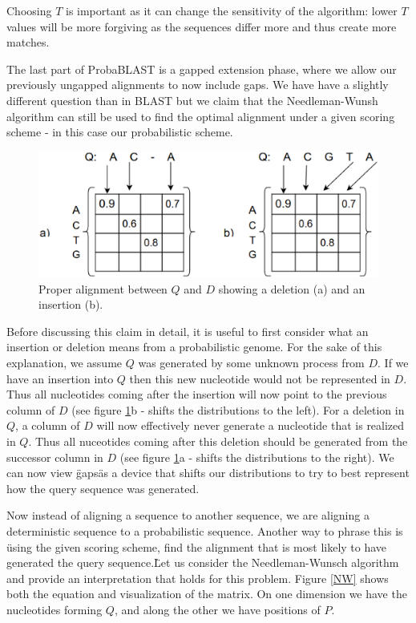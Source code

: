 \documentclass[12pt]{article}%
\begin{document}
Choosing $T$ is important as it can change the sensitivity of the algorithm: lower $T$ values will be more forgiving as the sequences differ more and thus create more matches.

The last part of ProbaBLAST is a gapped extension phase, where we allow our previously ungapped alignments to now include gaps. We have have a slightly different question than in BLAST but we claim that the Needleman-Wunsh algorithm can still be used to find the optimal alignment under a given scoring scheme - in this case our probabilistic scheme.

\begin{figure}
    \centering
    \includegraphics[scale=0.5]{indel}
    \caption{Proper alignment between $Q$ and $D$ showing a deletion (a) and an insertion (b).}
    \label{indel}
\end{figure}

Before discussing this claim in detail, it is useful to first consider what an insertion or deletion means from a probabilistic genome. For the sake of this explanation, we assume $Q$ was generated by some unknown process from $D$. If we have an insertion into $Q$ then this new nucleotide would not be represented in $D$. Thus all nucleotides coming after the insertion will now point to the previous column of $D$ (see figure \ref{indel}b - shifts the distributions to the left). For a deletion in $Q$, a column of $D$ will now effectively never generate a nucleotide that is realized in $Q$. Thus all nuceotides coming after this deletion should be generated from the successor column in $D$ (see figure \ref{indel}a - shifts the distributions to the right). We can now view \"gaps\" as a device that shifts our distributions to try to best represent how the query sequence was generated.

Now instead of aligning a sequence to another sequence, we are aligning a deterministic sequence to a probabilistic sequence. Another way to phrase this is \"using the given scoring scheme, find the alignment that is most likely to have generated the query sequence.\" Let us consider the Needleman-Wunsch algorithm and provide an interpretation that holds for this problem. Figure \ref{NW} shows both the equation and visualization of the matrix. On one dimension we have the nucleotides forming $Q$, and along the other we have positions of $P$. 
\end{document}
